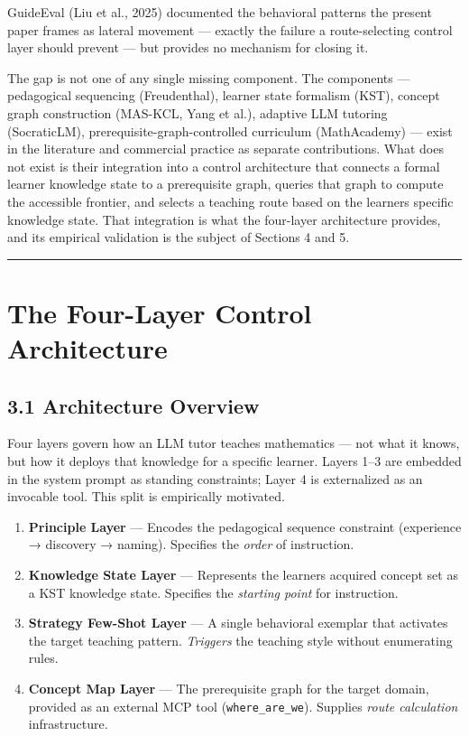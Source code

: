 \documentclass[
]{article}
\providecommand{\tightlist}{%
  \setlength{\itemsep}{0pt}\setlength{\parskip}{0pt}}
\begin{document}
GuideEval (Liu et al., 2025) documented the behavioral patterns the present paper frames as lateral movement --- exactly the failure a route-selecting control layer should prevent --- but provides no mechanism for closing it.

The gap is not one of any single missing component. The components --- pedagogical sequencing (Freudenthal), learner state formalism (KST), concept graph construction (MAS-KCL, Yang et al.), adaptive LLM tutoring (SocraticLM), prerequisite-graph-controlled curriculum (MathAcademy) --- exist in the literature and commercial practice as separate contributions. What does not exist is their integration into a control architecture that connects a formal learner knowledge state to a prerequisite graph, queries that graph to compute the accessible frontier, and selects a teaching route based on the learner\textquotesingle s specific knowledge state. That integration is what the four-layer architecture provides, and its empirical validation is the subject of Sections 4 and 5.

\begin{center}\rule{0.5\linewidth}{0.5pt}\end{center}

\section{The Four-Layer Control Architecture}\label{the-four-layer-control-architecture}

\subsection{3.1 Architecture Overview}\label{31-architecture-overview}

Four layers govern how an LLM tutor teaches mathematics --- not what it knows, but how it deploys that knowledge for a specific learner. Layers 1--3 are embedded in the system prompt as standing constraints; Layer 4 is externalized as an invocable tool. This split is empirically motivated.

\begin{enumerate}
\def\labelenumi{\arabic{enumi}.}
\tightlist
\item
  \textbf{Principle Layer} --- Encodes the pedagogical sequence constraint (experience → discovery → naming). Specifies the \emph{order} of instruction.
\item
  \textbf{Knowledge State Layer} --- Represents the learner\textquotesingle s acquired concept set as a KST knowledge state. Specifies the \emph{starting point} for instruction.
\item
  \textbf{Strategy Few-Shot Layer} --- A single behavioral exemplar that activates the target teaching pattern. \emph{Triggers} the teaching style without enumerating rules.
\item
  \textbf{Concept Map Layer} --- The prerequisite graph for the target domain, provided as an external MCP tool (\texttt{where\_are\_we}). Supplies \emph{route calculation} infrastructure.
\end{enumerate}
\end{document}
